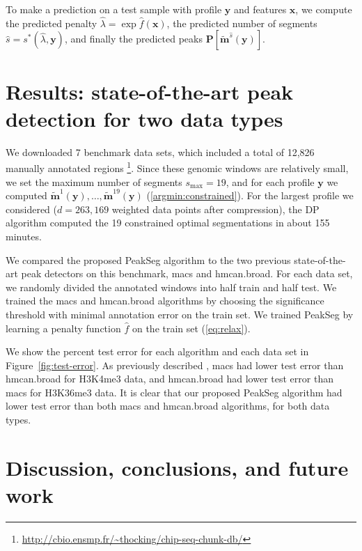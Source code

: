 \documentclass{article}
\begin{document}
To make a prediction on a
test sample with profile $\mathbf y$ and features $\mathbf x$, we
compute the predicted penalty $\hat \lambda = \exp \hat f(\mathbf x)$,
the predicted number of segments $\hat s = s^*(\hat \lambda, \mathbf
y)$, and finally the predicted peaks $\mathbf P\left[ \mathbf{\tilde
    m}^{\hat s}(\mathbf y) \right]$.

\section{Results: state-of-the-art peak detection for two data types}

We downloaded 7 benchmark data sets, which included a
total of 12,826 manually annotated regions
\footnote{\url{http://cbio.ensmp.fr/~thocking/chip-seq-chunk-db/}}.
Since these genomic windows are relatively small, we set the maximum
number of segments $s_{\text{max}}=19$, and for each profile $\mathbf
y$ we computed $\mathbf{\tilde m}^1(\mathbf y), \dots, \mathbf{\tilde
  m}^{19}(\mathbf y)$ (\ref{argmin:constrained}). For the largest
profile we considered ($d=263,169$ weighted data points after
compression), the DP algorithm computed the 19 constrained optimal
segmentations in about 155 minutes.

We compared the proposed PeakSeg algorithm to the two previous
state-of-the-art peak detectors on this benchmark, macs and
\mbox{hmcan.broad}. For each data set, we randomly divided the
annotated windows into half train and half test. We trained the macs
and hmcan.broad algorithms by choosing the significance threshold with
minimal annotation error on the train set. We trained PeakSeg by
learning a penalty function $\hat f$ on the train set
(\ref{eq:relax}).

We show the percent test error for each algorithm and each data set in
Figure~\ref{fig:test-error}. As previously described
\citep{hocking2014visual}, macs had lower test error than
\mbox{hmcan.broad} for H3K4me3 data, and \mbox{hmcan.broad} had lower
test error than macs for H3K36me3 data. It is clear that our proposed
PeakSeg algorithm had lower test error than both macs and hmcan.broad
algorithms, for both data types.

%   

\section{Discussion, conclusions, and future work}
\end{document}

